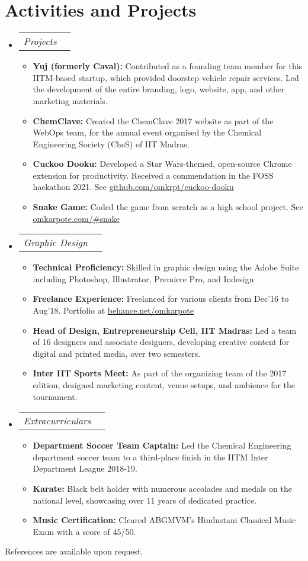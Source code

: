 \documentclass[letterpaper,11pt]{article}
\makeatletter
\newcommand{\resumeItem}[1]{
  \item\small{
    {#1 \vspace{-2pt}}
  }
}
\newcommand{\resumeSubSubheading}[2]{
    \item
    \begin{tabular*}{1.0\textwidth}{l@{\extracolsep{\fill}}r}
      \textit{\small#1} & \textit{\small #2} \\
    \end{tabular*}\vspace{-7pt}
}
\newcommand{\resumeSubHeadingListStart}{\begin{itemize}[leftmargin=0.0in, label={}]}
\newcommand{\resumeSubHeadingListEnd}{\end{itemize}}
\newcommand{\resumeItemListStart}{\begin{itemize}}
\newcommand{\resumeItemListEnd}{\end{itemize}\vspace{-5pt}}
\makeatother
\begin{document}
\section{Activities and Projects}
    \resumeSubHeadingListStart
        \resumeSubSubheading
            {Projects}{}
            \resumeItemListStart
                \resumeItem{\textbf{Yuj (formerly Caval):} Contributed as a founding team member for this IITM-based startup, which provided doorstep vehicle repair services. Led the development of the entire branding, logo, website, app, and other marketing materials.}
                \resumeItem{\textbf{ChemClave:} Created the ChemClave 2017 website as part of the WebOps team, for the annual event organised by the Chemical Engineering Society (CheS) of IIT Madras.}
                \resumeItem{\textbf{Cuckoo Dooku:} Developed a Star Wars-themed, open-source Chrome extension for productivity. Received a commendation in the FOSS hackathon 2021. See \href{https://github.com/omkrpt/cuckoo-dooku}{\underline{github.com/omkrpt/cuckoo-dooku}}}
                \resumeItem{\textbf{Snake Game:} Coded the game from scratch as a high school project. See
                \href{https://omkarpote.com/\#snake}{\underline{omkarpote.com/\#snake}}}
            \resumeItemListEnd
        \resumeSubSubheading
            {Graphic Design}{}
            \resumeItemListStart
                \resumeItem{\textbf{Technical Proficiency:} Skilled in graphic design using the Adobe Suite including Photoshop, Illustrator, Premiere Pro, and Indesign}
                \resumeItem{\textbf{Freelance Experience:} Freelanced for various clients from Dec'16 to Aug'18. Portfolio at 
                \href{https://www.behance.net/omkarpote}{\underline{behance.net/omkarpote}}}
                \resumeItem{\textbf{Head of Design, Entrepreneurship Cell, IIT Madras:} Led a team of 16 designers and associate designers, developing creative content for digital and printed media, over two semesters.}
                \resumeItem{\textbf{Inter IIT Sports Meet:} As part of the organizing team of the 2017 edition, designed marketing content, venue setups, and ambience for the tournament.}
            \resumeItemListEnd
        \resumeSubSubheading
            {Extracurriculars}{}
            \resumeItemListStart
                \resumeItem{\textbf{Department Soccer Team Captain:} Led the Chemical Engineering department soccer team to a third-place finish in the IITM Inter Department League 2018-19.}
                \resumeItem{\textbf{Karate:} Black belt holder with numerous accolades and medals on the national level, showcasing over 11 years of dedicated practice.}
                \resumeItem{\textbf{Music Certification:} Cleared ABGMVM's Hindustani Classical Music Exam with a score of 45/50.}
            \resumeItemListEnd
        
    \resumeSubHeadingListEnd

References are available upon request.
    
\end{document}
